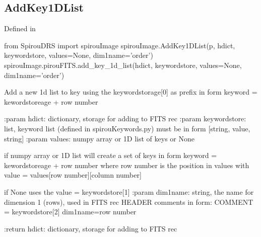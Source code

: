 \noindent\begin{minipage}{\textwidth}
\subsection{AddKey1DList}

Defined in \spirouImage{}

\begin{pythonbox}
from SpirouDRS import spirouImage
spirouImage.AddKey1DList(p, hdict, keywordstore, values=None, dim1name='order')
spirouImage.pirouFITS.add_key_1d_list(hdict, keywordstore, values=None, dim1name='order')
\end{pythonbox}

\begin{pythondocstring}
Add a new 1d list to key using the keywordstorage[0] as prefix in form
keyword = kewordstoreage + row number

:param hdict: dictionary, storage for adding to FITS rec
:param keywordstore: list, keyword list (defined in spirouKeywords.py)
                     must be in form [string, value, string]
:param values: numpy array or 1D list of keys or None

              if numpy array or 1D list will create a set of keys in form
              keyword = kewordstoreage + row number
              where row number is the position in values
              with value = values[row number][column number]

              if None uses the value = keywordstore[1]
:param dim1name: string, the name for dimension 1 (rows), used in FITS rec
                 HEADER comments in form:
      COMMENT = keywordstore[2] dim1name={row number}

:return hdict: dictionary, storage for adding to FITS rec
\end{pythondocstring}
\end{minipage}

